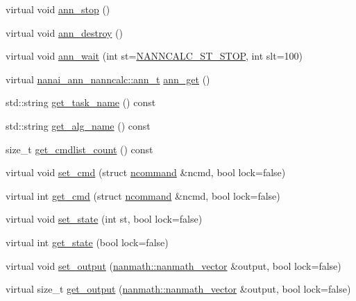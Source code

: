 \begin{DoxyCompactItemize}
virtual void \hyperlink{classnanai_1_1nanai__ann__nanncalc_ab7c70e33ab6d4ddcc46fcbdd69a14281}{ann\+\_\+stop} ()
\item 
virtual void \hyperlink{classnanai_1_1nanai__ann__nanncalc_a4fb9643a590238c96e8e387022626bd6}{ann\+\_\+destroy} ()
\item 
virtual void \hyperlink{classnanai_1_1nanai__ann__nanncalc_a7b69abc3ab21a6249f360f2c8f319501}{ann\+\_\+wait} (int st=\hyperlink{nanai__ann__nanncalc_8h_abf1ad245b3da2bb8ed628a379ea2c939}{N\+A\+N\+N\+C\+A\+L\+C\+\_\+\+S\+T\+\_\+\+S\+T\+O\+P}, int slt=100)
\item 
virtual \hyperlink{classnanai_1_1nanai__ann__nanncalc_1_1ann__t}{nanai\+\_\+ann\+\_\+nanncalc\+::ann\+\_\+t} \hyperlink{classnanai_1_1nanai__ann__nanncalc_a41ca7081ea2c4244c7013b8edc86e6ba}{ann\+\_\+get} ()
\item 
std\+::string \hyperlink{classnanai_1_1nanai__ann__nanncalc_aa75fcea728a087178b4699a2e2e86a6f}{get\+\_\+task\+\_\+name} () const 
\item 
std\+::string \hyperlink{classnanai_1_1nanai__ann__nanncalc_a19cc8a310068a44c568ada1c9e72d028}{get\+\_\+alg\+\_\+name} () const 
\item 
size\+\_\+t \hyperlink{classnanai_1_1nanai__ann__nanncalc_aa3adf3454d9953ae48e3b0f98ea0cee0}{get\+\_\+cmdlist\+\_\+count} () const 
\item 
virtual void \hyperlink{classnanai_1_1nanai__ann__nanncalc_a0db0e8b62dbea77377e40a5d39f6265c}{set\+\_\+cmd} (struct \hyperlink{structnanai_1_1nanai__ann__nanncalc_1_1ncommand}{ncommand} \&ncmd, bool lock=false)
\item 
virtual int \hyperlink{classnanai_1_1nanai__ann__nanncalc_a18869c97f279df6aa8d467c32fdc7944}{get\+\_\+cmd} (struct \hyperlink{structnanai_1_1nanai__ann__nanncalc_1_1ncommand}{ncommand} \&ncmd, bool lock=false)
\item 
virtual void \hyperlink{classnanai_1_1nanai__ann__nanncalc_a2c8aa9f4f29bb093f0bc26fa9ba6cc41}{set\+\_\+state} (int st, bool lock=false)
\item 
virtual int \hyperlink{classnanai_1_1nanai__ann__nanncalc_abc792abf872514a95a9863cbb3e49cd4}{get\+\_\+state} (bool lock=false)
\item 
virtual void \hyperlink{classnanai_1_1nanai__ann__nanncalc_a5102b94199ba413bd8601e66be5d2293}{set\+\_\+output} (\hyperlink{classnanmath_1_1nanmath__vector}{nanmath\+::nanmath\+\_\+vector} \&output, bool lock=false)
\item 
virtual size\+\_\+t \hyperlink{classnanai_1_1nanai__ann__nanncalc_adc64a3c1efeef53374803673ee44c152}{get\+\_\+output} (\hyperlink{classnanmath_1_1nanmath__vector}{nanmath\+::nanmath\+\_\+vector} \&output, bool lock=false)

\end{DoxyCompactItemize}
